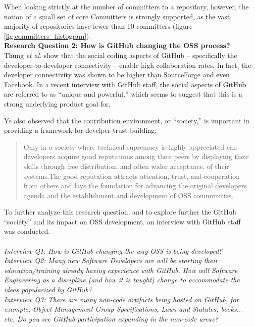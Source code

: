 \documentclass{proc}
\begin{document}
{{{{{{{When looking strictly at the number of committers to a repository, however, the notion of a small set of core Committers is strongly supported, as the vast majority of repositories have fewer than 10 committers (figure \ref{fig:committers_histogram}).\\

\textbf{Research Question 2: How is GitHub changing the OSS process?}\\
Thung \textit{et al.} show that the social coding aspects of GitHub -- specifically the developer-to-developer connectivity -- enable high collaboration rates.\cite{thung2013network} In fact, the developer connectivity was shown to be higher than SourceForge and even Facebook. In a recent interview with GitHub staff, the social aspects of GitHub are referred to as ``unique and powerful\cite{begel2013social},'' which seems to suggest that this is a strong underlying product goal for.

Ye also observed\cite{ye2003toward} that the contribution environment, or ``society,'' is important in providing a framework for develper trust building:
\begin{quote}
Only in a society where technical supremacy is highly appreciated can developers acquire good reputations among their peers by displaying their skills through free distribution, and often wider acceptance, of their systems.The good reputation attracts attention, trust, and cooperation from others and lays the foundation for advancing the original developers agenda and the establishment and development of OSS communities. 
\end{quote}

To further analyze this research question, and to explore further the GitHub ``society'' and its impact on OSS development, an interview with GitHub staff was conducted.\\\\
\textit{Interview Q1: How is GitHub changing the way OSS is being developed?}\\

\textit{Interview Q2: Many new Software Developers are will be starting their education/training already having experience with GitHub. How will Software Engineering as a discipline (and how it is taught) change to accommodate the ideas popularized by GitHub?}\\

\textit{Interview Q3: There are many non-code artifacts being hosted on GitHub, for example, Object Management Group Specifications, Laws and Statutes, books... etc. Do you see GitHub participation expanding in the non-code areas?}\\

}}}}}}}
\end{document}
